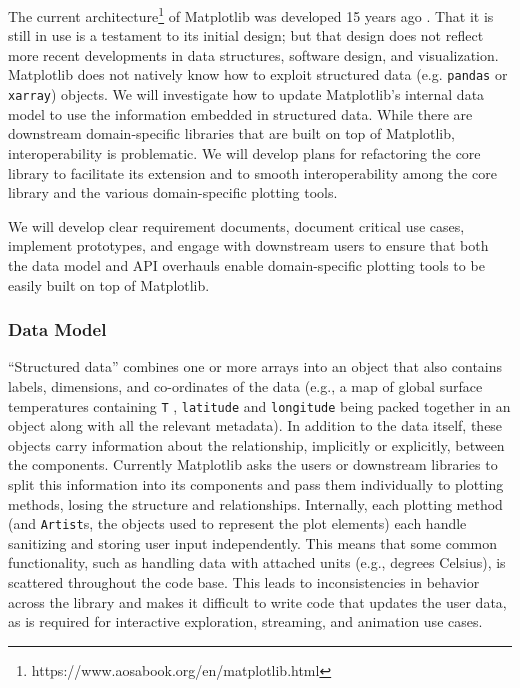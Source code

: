 \documentclass[11pt]{article}  %
\begin{document}
The current
architecture\footnote{https://www.aosabook.org/en/matplotlib.html} of
Matplotlib was developed 15 years ago \cite{Hunter:2007}.  That
it is still in use is a testament to its initial design; but that
design does not reflect more recent developments in data
structures, software design, and visualization.
Matplotlib does not natively know how to exploit structured data
(e.g. \texttt{pandas} or \texttt{xarray}) objects.  We will investigate
how to update Matplotlib's internal data model to use the
information embedded in structured data.  While there are downstream
domain-specific libraries that are built on top of Matplotlib,
interoperability is problematic.  We will develop plans for
refactoring the core library to facilitate its
extension and to smooth interoperability among the core
library and the various domain-specific plotting tools.

We will develop clear requirement documents, document critical use
cases, implement prototypes, and engage with downstream users to
ensure that both the data model and API overhauls enable domain-specific
plotting tools to be easily built on top of Matplotlib.


\subsubsection{Data Model}

``Structured data'' combines one or more arrays into an object that
also contains labels, dimensions, and co-ordinates of the data (e.g., a
map of global surface temperatures containing \texttt{T} ,
\texttt{latitude} and \texttt{longitude} being packed together in an
object along with all the relevant metadata).  In addition to the
data itself, these objects carry information about the
relationship, implicitly or explicitly, between the components.
Currently Matplotlib asks the users or downstream libraries to split
this information into its components and pass them individually to
plotting methods, losing the structure and relationships.
Internally, each plotting method (and \texttt{Artist}s, the objects
used to represent the plot elements) each handle sanitizing and storing user
input independently.  This means that some common functionality, such
as handling data with attached units (e.g., degrees Celsius), is scattered
throughout the
code base.  This leads to inconsistencies in behavior across the
library and makes it difficult to write code that updates the user
data, as is required for interactive exploration, streaming, and animation
use cases.
\end{document}
